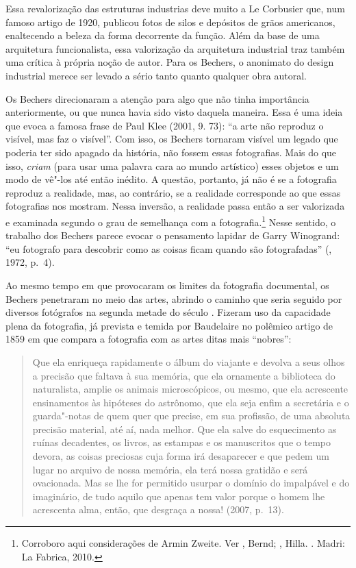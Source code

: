 Essa revalorização das estruturas industrias deve muito a Le Corbusier
que, num famoso artigo de 1920, publicou fotos de silos e depósitos de
grãos americanos, enaltecendo a beleza da forma decorrente da função.
Além da base de uma arquitetura funcionalista, essa valorização da
arquitetura industrial traz também uma crítica à própria noção de autor.
Para os Bechers, o anonimato do design industrial merece ser levado a
sério tanto quanto qualquer obra autoral.

Os Bechers direcionaram a atenção para algo que não tinha importância
anteriormente, ou que nunca havia sido visto daquela maneira. Essa é uma
ideia que evoca a famosa frase de Paul Klee (2001, 9. 73): ``a arte não
reproduz o visível, mas faz o visível''. Com isso, os Bechers tornaram
visível um legado que poderia ter sido apagado da história, não fossem
essas fotografias. Mais do que isso, \emph{criam} (para usar uma palavra
cara ao mundo artístico) esses objetos e um modo de vê"-los até então
inédito. A questão, portanto, já não é se a fotografia reproduz a
realidade, mas, ao contrário, se a realidade corresponde ao que essas
fotografias nos mostram. Nessa inversão, a realidade passa então a ser
valorizada e examinada segundo o grau de semelhança com a
fotografia.\footnote{Corroboro aqui considerações de Armin Zweite. Ver
  , Bernd; , Hilla. {}. Madri: La Fabrica, 2010.}
Nesse sentido, o trabalho dos Bechers parece evocar o pensamento lapidar
de Garry Winogrand: ``eu fotografo para descobrir como as coisas ficam
quando são fotografadas'' (, 1972, p.~4).

Ao mesmo tempo em que provocaram os limites da fotografia documental, os
Bechers penetraram no meio das artes, abrindo o caminho que seria
seguido por diversos fotógrafos na segunda metade do século . Fizeram
uso da capacidade plena da fotografia, já prevista e temida por
Baudelaire no polêmico artigo de 1859 em que compara a
fotografia com as artes ditas mais ``nobres'':

\begin{quote}
Que ela enriqueça rapidamente o álbum do viajante e devolva a seus olhos
a precisão que faltava à sua memória, que ela ornamente a biblioteca do
naturalista, amplie os animais microscópicos, ou mesmo, que ela
acrescente ensinamentos às hipóteses do astrônomo, que ela seja enfim a
secretária e o guarda"-notas de quem quer que precise, em sua profissão,
de uma absoluta precisão material, até aí, nada melhor. Que ela salve do
esquecimento as ruínas decadentes, os livros, as estampas e os
manuscritos que o tempo devora, as coisas preciosas cuja forma irá
desaparecer e que pedem um lugar no arquivo de nossa memória, ela terá
nossa gratidão e será ovacionada. Mas se lhe for permitido usurpar o
domínio do impalpável e do imaginário, de tudo aquilo que apenas tem
valor porque o homem lhe acrescenta alma, então, que desgraça a nossa!
(2007, p.~13).
\end{quote}

